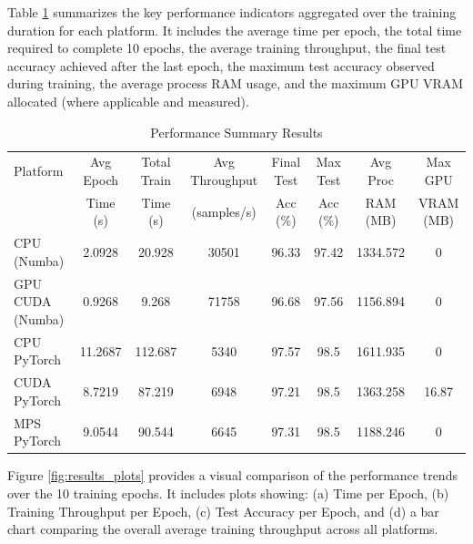 \documentclass[conference]{IEEEtran} %
\begin{document}
Table \ref{tab:results_summary} summarizes the key performance indicators aggregated over the training duration for each platform. It includes the average time per epoch, the total time required to complete 10 epochs, the average training throughput, the final test accuracy achieved after the last epoch, the maximum test accuracy observed during training, the average process RAM usage, and the maximum GPU VRAM allocated (where applicable and measured).

\begin{table}[htbp]
    \centering
    \caption{Performance Summary Results}
    \label{tab:results_summary} 
    \renewcommand{\arraystretch}{1.1}
    \begin{tabular}{@{}lccccccc@{}} 
        \toprule
        Platform            & Avg Epoch & Total Train   & Avg Throughput    & Final Test    & Max Test  & Avg Proc  & Max GPU   \\
                            & Time (s)  & Time (s)      & (samples/s)       & Acc (\%)      & Acc (\%)  & RAM (MB)  & VRAM (MB) \\
        \midrule
        CPU (Numba)         & 2.0928    & 20.928        & 30501             & 96.33         & 97.42     & 1334.572  & 0         \\
        GPU CUDA (Numba)    & 0.9268    & 9.268         & 71758             & 96.68         & 97.56     & 1156.894  & 0         \\
        CPU PyTorch         & 11.2687   & 112.687       & 5340              & 97.57         & 98.5      & 1611.935  & 0         \\
        CUDA PyTorch        & 8.7219    & 87.219        & 6948              & 97.21         & 98.5      & 1363.258  & 16.87     \\
        MPS PyTorch         & 9.0544    & 90.544        & 6645              & 97.31         & 98.5      & 1188.246  & 0         \\
        \bottomrule
    \end{tabular}
    \vspace{0.1cm}
\end{table}

Figure \ref{fig:results_plots} provides a visual comparison of the performance trends over the 10 training epochs. It includes plots showing: (a) Time per Epoch, (b) Training Throughput per Epoch, (c) Test Accuracy per Epoch, and (d) a bar chart comparing the overall average training throughput across all platforms.
\end{document}
